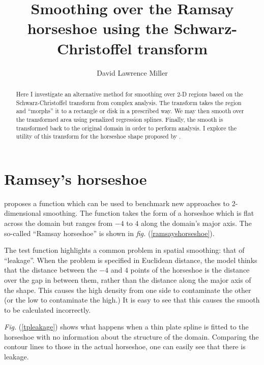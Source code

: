 \documentclass[a4paper,10pt]{amsart}
\title{Smoothing over the Ramsay horseshoe using the Schwarz-Christoffel transform}
\author{David Lawrence Miller}
\newcommand{\fig}[1]{\emph{fig.} (\ref{#1})}
\newcommand{\Fig}[1]{\emph{Fig.} (\ref{#1})}
\begin{document}
\begin{abstract}
Here I investigate an alternative method for smoothing over 2-D regions based on the Schwarz-Christoffel transform from complex analysis. The transform takes the region and ``morphs'' it to a rectangle or disk in a prescribed way. We may then smooth over the transformed area using penalized regression splines. Finally, the smooth is transformed back to the original domain in order to perform analysis. I explore the utility of this transform for the horseshoe shape proposed by \cite{ramsay}.
\end{abstract}


\newtheorem{thm}{Theorem}[section]

\newtheorem{defn}{Definition}[section]

\maketitle



\section{Ramsey's horseshoe}

\cite{ramsay} proposes a function which can be used to benchmark new approaches to 2-dimensional smoothing. The function takes the form of a horseshoe which is flat across the domain but ranges from $-4$ to $4$ along the domain's major axis. The so-called ``Ramsay horseshoe'' is shown in \fig{ramsayshorseshoe}.

The test function highlights a common problem in spatial smoothing: that of ``leakage''. When the problem is specified in Euclidean distance, the model thinks that the distance between the $-4$ and $4$ points of the horseshoe is the distance over the gap in between them, rather than the distance along the major axis of the shape. This causes the high density from one side to contaminate the other (or the low to contaminate the high.) It is easy to see that this causes the smooth to be calculated incorrectly.

\Fig{tpleakage} shows what happens when a thin plate spline is fitted to the horseshoe with no information about the structure of the domain. Comparing the contour lines to those in the actual horseshoe, one can easily see that there is leakage.
\end{document}
